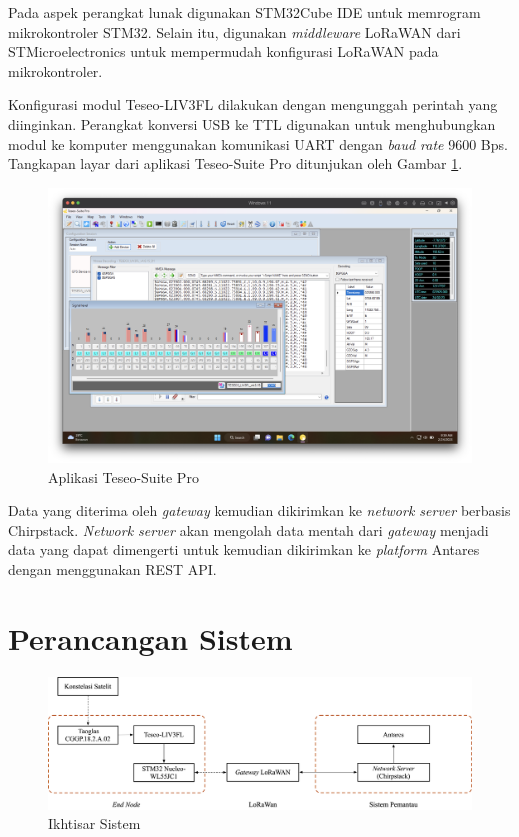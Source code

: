 Pada aspek perangkat lunak digunakan STM32Cube IDE untuk memrogram mikrokontroler STM32. Selain itu, digunakan \textit{middleware} LoRaWAN dari STMicroelectronics untuk mempermudah konfigurasi LoRaWAN pada mikrokontroler. 

Konfigurasi modul Teseo-LIV3FL dilakukan dengan mengunggah perintah yang diinginkan. Perangkat konversi USB ke TTL digunakan untuk menghubungkan modul ke komputer menggunakan komunikasi UART dengan \textit{baud rate} 9600 Bps. Tangkapan layar dari aplikasi Teseo-Suite Pro ditunjukan oleh Gambar \ref{Fig: teseo-suite}.

\begin{figure}[H]
	\centering
	\includegraphics[width=15cm]{contents/chapter-3/teseo-suite.png}
	\caption{Aplikasi Teseo-Suite Pro}
	\label{Fig: teseo-suite}
\end{figure}

Data yang diterima oleh \textit{gateway} kemudian dikirimkan ke \textit{network server} berbasis Chirpstack. \textit{Network server} akan mengolah data mentah dari \textit{gateway} menjadi data yang dapat dimengerti untuk kemudian dikirimkan ke \textit{platform} Antares dengan menggunakan REST API.

\section{Perancangan Sistem}
\begin{figure}[H]
	\centering
	\includegraphics[width=15cm]{contents/chapter-3/system-overview.png}
	\caption{Ikhtisar Sistem}
	\label{Fig: system-overview}
\end{figure}
